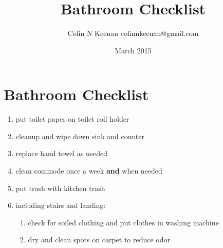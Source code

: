 \documentclass[12pt,letterpaper]{article}
\newcommand{\mytitle}{Bathroom Checklist}
\begin{document}
\title{\mytitle{}}
\author{Colin N Keenan colinnkeenan@gmail.com}
\date{March 2015}
\section*{\mytitle{}}
\begin{enumerate}
	\item put toilet paper on toilet roll holder
	\item cleanup and wipe down sink and counter
	\item replace hand towel as needed
	\item clean commode once a week \textbf{and} when needed
	\item put trash with kitchen trash
	\item including stairs and landing:
		\begin{enumerate}
			\item check for soiled clothing and put clothes in washing machine
			\item dry and clean spots on carpet to reduce odor
		\end{enumerate}
\end{enumerate}
\end{document}
